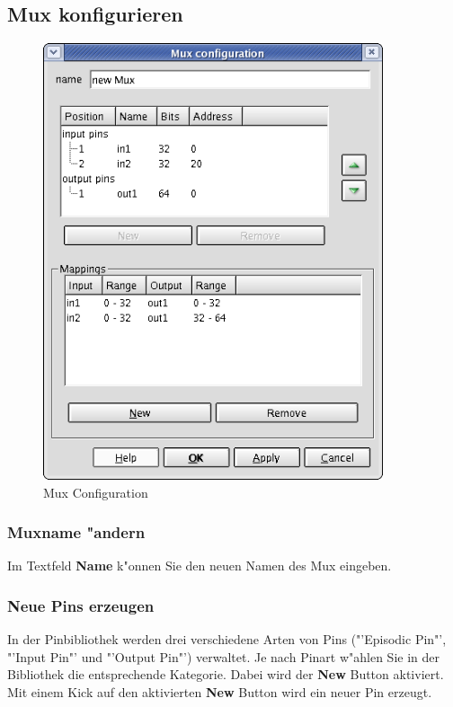 \documentclass[a4paper,titlepage,12pt,ngerman]{scrbook}
\begin{document}
\subsection{Mux konfigurieren}
\begin{figure}[htbp]

\begin{center}

\includegraphics[width=10cm]{MuxConfiguration}

\caption{Mux Configuration}\label{test}

\end{center}

\end{figure}
\subsubsection{Muxname "andern}
Im Textfeld {\bf Name} k"onnen Sie den neuen Namen des Mux eingeben.
\subsubsection{Neue Pins erzeugen}
In der Pinbibliothek werden drei verschiedene Arten von Pins ("'Episodic Pin"', "'Input Pin"' und "'Output Pin"') verwaltet. Je nach Pinart w"ahlen Sie in der Bibliothek die entsprechende Kategorie. Dabei wird der {\bf New} Button aktiviert. Mit einem Kick auf den aktivierten {\bf New} Button wird ein neuer Pin erzeugt. \par
\end{document}
